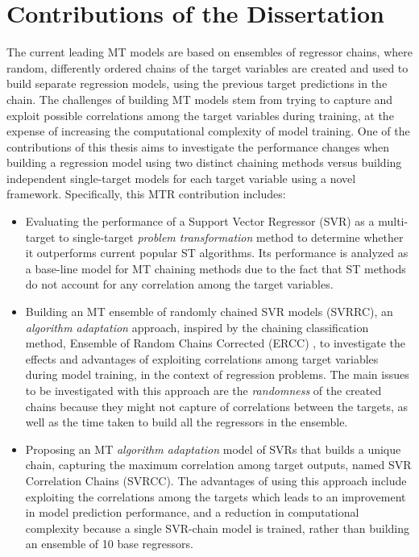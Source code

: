 \documentclass[reqno]{vcuthesis}
\newcommand{\iitem}{\item[-]}
\numberwithin{equation}{chapter}
\begin{document}
\section{Contributions of the Dissertation \label{sec:introcontribute} }
The current leading MT models are based on ensembles of regressor chains, where random, differently ordered chains of the target variables are created and used to build separate regression models, using the previous target predictions in the chain. The challenges of building MT models stem from trying to capture and exploit possible correlations among the target variables during training, at the expense of increasing the computational complexity of model training. One of the contributions of this thesis aims to investigate the performance changes when building a regression model using two distinct chaining methods versus building independent single-target models for each target variable using a novel framework. Specifically, this MTR contribution includes:
\begin{itemize}
\iitem Evaluating the performance of a Support Vector Regressor (SVR) as a multi-target to single-target \textit{problem transformation} method to determine whether it outperforms current popular ST algorithms. Its performance is analyzed as a base-line model for MT chaining methods due to the fact that ST methods do not account for any correlation among the target variables.

\iitem Building an MT ensemble of randomly chained SVR models (SVRRC), an \textit{algorithm adaptation} approach, inspired by the chaining classification method, Ensemble of Random Chains Corrected (ERCC) {\cite{Spyromitros2014}}, to investigate the effects and advantages of exploiting correlations among target variables during model training, in the context of regression problems. The main issues to be investigated with this approach are the \textit{randomness} of the created chains because they might not capture of correlations between the targets, as well as the time taken to build all the regressors in the ensemble.

\iitem Proposing an MT \textit{algorithm adaptation} model of SVRs that builds a unique chain, capturing the maximum correlation among target outputs, named SVR Correlation Chains (SVRCC). The advantages of using this approach include exploiting the correlations among the targets which leads to an improvement in model prediction performance, and a reduction in computational complexity because a single SVR-chain model is trained, rather than building an ensemble of 10 base regressors.
\end{itemize}
\end{document}
